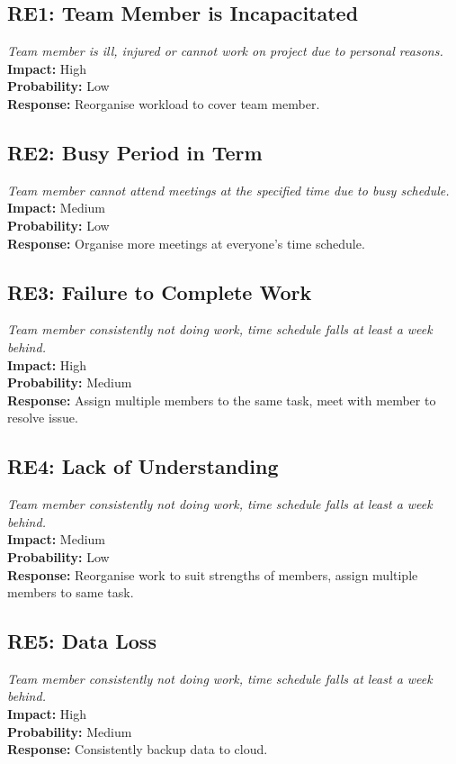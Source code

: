 \documentclass[11pt]{report}
\begin{document}
\subsection{RE1: Team Member is Incapacitated}
\textit{Team member is ill, injured or cannot work on project due to personal reasons.}
\textbf{Impact:} High \\
\textbf{Probability:} Low\\
\textbf{Response:} Reorganise workload to cover team member.

\subsection{RE2: Busy Period in Term}
\textit{Team member cannot attend meetings at the specified time due to busy schedule.}\\
\textbf{Impact:} Medium \\
\textbf{Probability:} Low\\
\textbf{Response:} Organise more meetings at everyone's time schedule.

\subsection{RE3: Failure to Complete Work}
\textit{Team member consistently not doing work, time schedule falls at least a week behind.}\\
\textbf{Impact:} High \\
\textbf{Probability:} Medium\\
\textbf{Response:} Assign multiple members to the same task, meet with member to resolve issue.

\subsection{RE4: Lack of Understanding}
\textit{Team member consistently not doing work, time schedule falls at least a week behind.}\\
\textbf{Impact:} Medium \\
\textbf{Probability:} Low\\
\textbf{Response:} Reorganise work to suit strengths of members, assign multiple members to same task.

\subsection{RE5: Data Loss}
\textit{Team member consistently not doing work, time schedule falls at least a week behind.}\\
\textbf{Impact:} High \\
\textbf{Probability:} Medium\\
\textbf{Response:} Consistently backup data to cloud.
\end{document}
